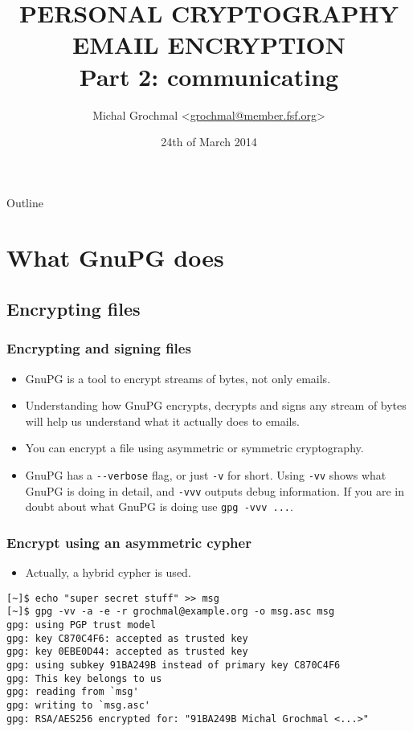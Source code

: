 \documentclass[hyperref={colorlinks=true}]{beamer}
\title[PERSONAL CRYPTOGRAPHY - EMAIL ENCRYPTION 2]{PERSONAL CRYPTOGRAPHY \\
                                                   EMAIL ENCRYPTION \\
                                                   Part 2: communicating}
\author{Michal Grochmal
  <\href{mailto:grochmal@member.fsf.org}{grochmal@member.fsf.org}>}
\institute{Queen Mary University of London}
\date{24th of March 2014}
\begin{document}
\begin{frame}
  \titlepage
\end{frame}

\begin{frame}{Outline}
  \tableofcontents[pausesections]
\end{frame}

\section{What GnuPG does}

\subsection{Encrypting files}
\begin{frame}[fragile]\frametitle{Encrypting and signing files}
  \begin{itemize}
    \item GnuPG is a tool to encrypt streams of bytes, not only emails.
    \item Understanding how GnuPG encrypts, decrypts and signs any stream of
bytes will help us understand what it actually does to emails.
    \item You can encrypt a file using asymmetric or symmetric cryptography.
    \item GnuPG has a \verb|--verbose| flag, or just \verb|-v| for short.
Using \verb|-vv| shows what GnuPG is doing in detail, and \verb|-vvv| outputs
debug information.  If you are in doubt about what GnuPG is doing use
\verb|gpg -vvv ...|.
  \end{itemize}
\end{frame}

\begin{frame}[fragile]\frametitle{Encrypt using an asymmetric cypher}
  \begin{itemize}
    \item Actually, a hybrid cypher is used.
  \end{itemize}
{\footnotesize
\begin{verbatim}
[~]$ echo "super secret stuff" >> msg
[~]$ gpg -vv -a -e -r grochmal@example.org -o msg.asc msg
gpg: using PGP trust model
gpg: key C870C4F6: accepted as trusted key
gpg: key 0EBE0D44: accepted as trusted key
gpg: using subkey 91BA249B instead of primary key C870C4F6
gpg: This key belongs to us
gpg: reading from `msg'
gpg: writing to `msg.asc'
gpg: RSA/AES256 encrypted for: "91BA249B Michal Grochmal <...>"
\end{verbatim}
}
\end{frame}
\end{document}
